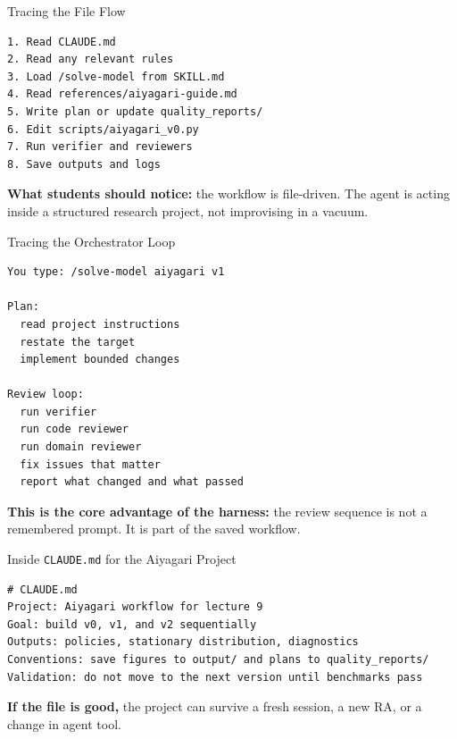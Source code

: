 \documentclass[10pt,english,aspectratio=169]{beamer}
\begin{document}
\begin{frame}[fragile]{Tracing the File Flow}
\begin{lstlisting}[style=pythonstyle,language={},basicstyle=\ttfamily\scriptsize]
1. Read CLAUDE.md
2. Read any relevant rules
3. Load /solve-model from SKILL.md
4. Read references/aiyagari-guide.md
5. Write plan or update quality_reports/
6. Edit scripts/aiyagari_v0.py
7. Run verifier and reviewers
8. Save outputs and logs
\end{lstlisting}

\vspace{0.2cm}

\textbf{What students should notice:} the workflow is file-driven. The agent is acting inside a structured research project, not improvising in a vacuum.
\end{frame}

\begin{frame}[fragile]{Tracing the Orchestrator Loop}
\begin{lstlisting}[style=pythonstyle,language={},basicstyle=\ttfamily\scriptsize]
You type: /solve-model aiyagari v1

Plan:
  read project instructions
  restate the target
  implement bounded changes

Review loop:
  run verifier
  run code reviewer
  run domain reviewer
  fix issues that matter
  report what changed and what passed
\end{lstlisting}

\vspace{0.2cm}

\textbf{This is the core advantage of the harness:} the review sequence is not a remembered prompt. It is part of the saved workflow.
\end{frame}

\begin{frame}[fragile]{Inside \texttt{CLAUDE.md} for the Aiyagari Project}
\begin{lstlisting}[style=pythonstyle,language={},basicstyle=\ttfamily\tiny,numbers=none]
# CLAUDE.md
Project: Aiyagari workflow for lecture 9
Goal: build v0, v1, and v2 sequentially
Outputs: policies, stationary distribution, diagnostics
Conventions: save figures to output/ and plans to quality_reports/
Validation: do not move to the next version until benchmarks pass
\end{lstlisting}

\vspace{0.2cm}

\textbf{If the file is good,} the project can survive a fresh session, a new RA, or a change in agent tool.
\end{frame}
\end{document}
